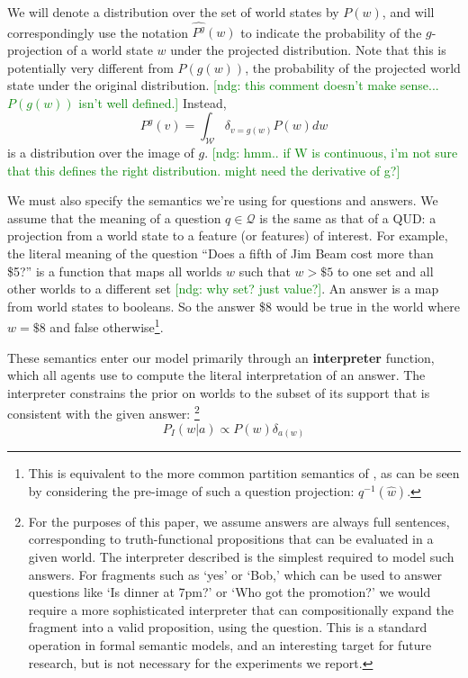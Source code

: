 \documentclass[12pt, floatsintext, jou]{apa6}
\newcommand{\ndg}[1]{\textcolor{Green}{[ndg: #1]}}
\begin{document}
We will denote a distribution over the set of world states by $P(w)$, and will correspondingly use the notation $\widehat{P^g}(w)$ to indicate the probability of the $g$-projection of a world state $w$ under the projected distribution. Note that this is potentially very different from $P(g(w))$, the probability of the projected world state under the original distribution. 
\ndg{this comment doesn't make sense... $P(g(w))$ isn't well defined.}
Instead, 
$$\widehat{P^g}(v) = \int_{\mathcal{W}} \delta_{v=g(w)}P(w)dw$$ is a distribution over the image of $g$. \ndg{hmm.. if W is continuous, i'm not sure that this defines the right distribution. might need the derivative of g?}

We must also specify the semantics we're using for questions and answers. We assume that the meaning of a question $q \in \mathcal{Q}$ is the same as that of a QUD: a projection from a world state to a feature (or features) of interest. For example, the literal meaning of the question ``Does a fifth of Jim Beam cost more than \$5?'' is a function that maps all worlds $w$ such that $w > \$5$ to one set and all other worlds to a different set \ndg{why set? just value?}. An answer is a map from world states to booleans. So the answer \$8 would be true in the world where $w = \$8$ and false otherwise\footnote{This is equivalent to the more common partition semantics of , as can be seen by considering the pre-image of such a question projection: $q^{-1}(\hat{w})$.}.

These semantics enter our model primarily through an \textbf{interpreter} function, which all agents use to compute the literal interpretation of an answer. The interpreter constrains the prior on worlds to the subset of its support that is consistent with the given answer:%
\footnote{For the purposes of this paper, we assume answers are always full sentences, corresponding to truth-functional propositions that can be evaluated in a given world. The interpreter described is the simplest required to model such answers. For fragments such as `yes' or `Bob,' which can be used to answer questions like `Is dinner at 7pm?' or `Who got the promotion?' we would require a more sophisticated interpreter that can compositionally expand the fragment into a valid proposition, using the question. This is a standard operation in formal semantic models, and an interesting target for future research, but is not necessary for the experiments we report.}
%
$$P_I(w | a) \propto P(w) \delta_{a(w)}$$
%
\end{document}
